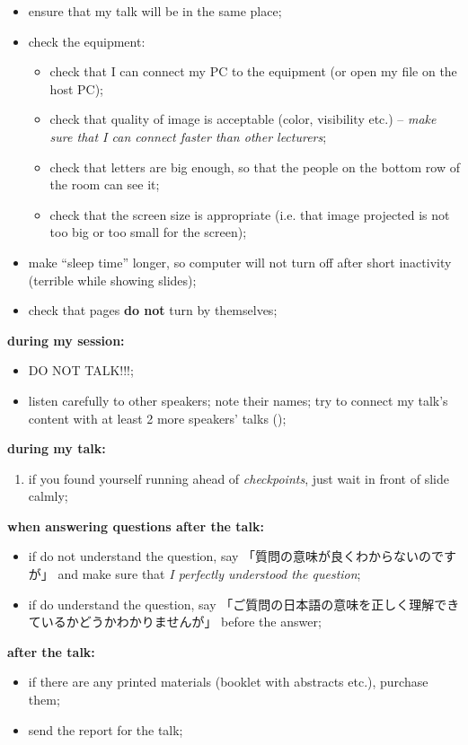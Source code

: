 \documentclass[12pt]{article} %
\begin{document}
	\begin{itemize}
		\item ensure that my talk will be in the same place;
		\item check the equipment:\begin{itemize}
				\item check that I can connect my PC to the equipment (or open my file on the host PC);
				\item check that quality of image is acceptable (color, visibility etc.) -- \textit{make sure that I can connect faster than other lecturers};
				\item check that letters are big enough, so that the people on the bottom row of the room can see it;
				\item check that the screen size is appropriate (i.e. that image projected is not too big or too small for the screen);
			\end{itemize}
		\item make ``sleep time'' longer, so computer will not turn off after short inactivity (terrible while showing slides);
		\item check that pages {\bf do not} turn by themselves;
	\end{itemize}
	\textbf{during my session:}
	\begin{itemize}
		\item DO NOT TALK!!!;
		\item listen carefully to other speakers; note their names; try to connect my talk's content with at least 2 more speakers' talks ();
	\end{itemize}
    \textbf{during my talk:}\begin{enumerate}
        \item if you found yourself running ahead of {\it checkpoints}, just wait in front of slide calmly;
    \end{enumerate}
	\textbf{when answering questions after the talk:}
	\begin{itemize}
		\item if do not understand the question, say 「質問の意味が良くわからないのですが」 and make sure that \textit{I perfectly understood the question};
		\item if do understand the question, say 「ご質問の日本語の意味を正しく理解できているかどうかわかりませんが」 before the answer;
	\end{itemize}
	\textbf{after the talk:}
	\begin{itemize}
		\item if there are any printed materials (booklet with abstracts etc.), purchase them;
        \item send the report for the talk;
	\end{itemize}
\end{document}

